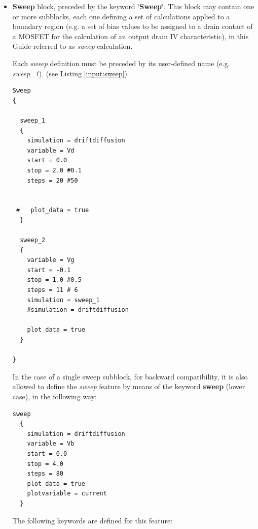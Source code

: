 \begin{itemize}
	
	
%
	
   \item \textbf{Sweep} block, preceded by the keyword \char`\"{}\textbf{Sweep}\char`\"{}. This block  may contain  one or  more subblocks, each one  defining 
  a set of  calculations applied to a boundary region (e.g. a set of bias values to be assigned to a drain contact of a MOSFET for the calculation of an output drain  IV characteristic), in this Guide referred to  as  \textit{sweep}  calculation. 

Each   \textit{sweep} definition must be preceded by   its  user-defined  name (e.g. \textit{sweep\_1}).
(see Listing \ref{input:sweep})

\begin{inputfile}
\begin{verbatim}
Sweep
{

  sweep_1
  {
    simulation = driftdiffusion
    variable = Vd
    start = 0.0
    stop = 2.0 #0.1
    steps = 20 #50

    
 #   plot_data = true
  }

  sweep_2
  {
    variable = Vg
    start = -0.1
    stop = 1.0 #0.5
    steps = 11 # 6
    simulation = sweep_1
    #simulation = driftdiffusion
    
    plot_data = true
  }

}

\end{verbatim}
\caption{Example of  \textbf{Sweep} section }
\label{input:sweep}
\end{inputfile}

In the  case of  a  single  sweep  subblock,  for backward compatibility, it is also allowed to    define  the  \textit{sweep}  feature by  means of  the  keyword \textbf{sweep} (lower case),  in  the  following  way:
\begin{verbatim}
sweep
  {
    simulation = driftdiffusion 
    variable = Vb
    start = 0.0
    stop = 4.0
    steps = 80
    plot_data = true
    plotvariable = current
  }
\end{verbatim}

The following  keywords  are  defined  for  this  feature:


\end{itemize}
